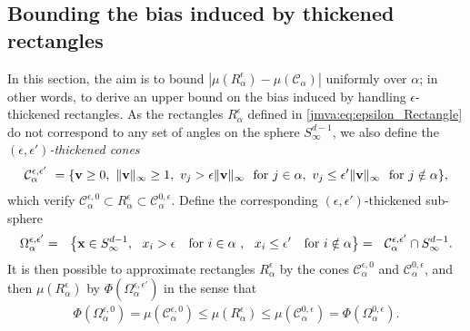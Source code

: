 \subsection{Bounding the bias induced by thickened rectangles}%
\label{jmva:sec:boundMuEpsilonCones}
In this section, the aim is to bound $|\mu(R_\alpha^\epsilon)-\mu(\mathcal{C}_\alpha)|$ uniformly over $\alpha$; in other words, to derive
an upper bound on the bias induced by handling
$\epsilon$-thickened rectangles. %
As the rectangles $R_\alpha^\epsilon$ defined in \eqref{jmva:eq:epsilon_Rectangle} do not correspond to any set of angles on the sphere $S_\infty^{d-1}$,
we also define the {\it $(\epsilon, \epsilon')$-thickened cones}  %
\begin{align}
\label{jmva:eq:epsilon_Cone}
\mathcal{C}_{\alpha}^{\epsilon, \epsilon'}~=\{\mathbf v \ge 0,~\|\mathbf v\|_\infty \ge 1,~ v_j > \epsilon \|\mathbf v\|_\infty  ~\text{ for } j \in \alpha,
~v_j \le \epsilon'  \|\mathbf v\|_\infty ~\text{ for } j \notin \alpha \} ,
\end{align}
which verify $\mathcal{C}_{\alpha}^{\epsilon, 0}\subset R_\alpha^\epsilon \subset \mathcal{C}_{\alpha}^{0, \epsilon}.$
Define the corresponding $(\epsilon, \epsilon')$-thickened sub-sphere
\begin{align}
\label{jmva:eq:epsilon_Sphere}
\Omega_{\alpha}^{\epsilon, \epsilon'} =~~ \big\{\mathbf x \in S^{d-1}_\infty , ~~ x_i >\epsilon ~~\text{ for } i\in\alpha~,~~  x_i \le \epsilon' ~~\text{ for
} i\notin \alpha   \big\} 
=~~ \mathcal{C}_\alpha^{\epsilon, \epsilon'} \cap S^{d-1}_\infty.
\end{align}
It is then possible to approximate rectangles $R_\alpha^\epsilon$ by the cones $\mathcal{C}_{\alpha}^{\epsilon, 0}$ and $\mathcal{C}_{\alpha}^{0, \epsilon}$, and then $\mu(R_\alpha^\epsilon)$ by $\Phi(\Omega_{\alpha}^{\epsilon, \epsilon'})$ in the sense that
\begin{align}
\label{jmva:eq:approx_Recctangle}
\Phi(\Omega_\alpha^{\epsilon, 0}) = \mu(\mathcal{C}_{\alpha}^{\epsilon, 0}) \le \mu(R_\alpha^\epsilon) \le \mu(\mathcal{C}_{\alpha}^{0, \epsilon}) = \Phi(\Omega_\alpha^{0, \epsilon}).
\end{align}

